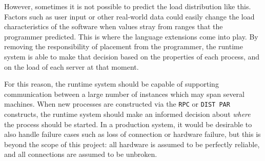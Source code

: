 However, sometimes it is not possible to predict the load distribution like
this. Factors such as user input or other real-world data could easily change
the load characteristics of the software when values stray from ranges that the
programmer predicted. This is where the language extensions come into play. By
removing the responsibility of placement from the programmer, the runtime system
is able to make that decision based on the properties of each process, and on
the load of each server at that moment.

For this reason, the runtime system should be capable of supporting
communication between a large number of instances which may span several
machines. When new processes are constructed via the \texttt{RPC} or
\texttt{DIST PAR} constructs, the runtime system should make an informed
decision about \textit{where} the process should be started. In a production
system, it would be desirable to also handle failure cases such as loss of
connection or hardware failure, but this is beyond the scope of this project:
all hardware is assumed to be perfectly reliable, and all connections are
assumed to be unbroken.
